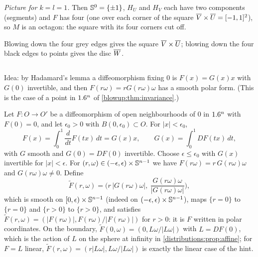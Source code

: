 \emph{Picture for $k=l=1$.} Then $\mathbb{S}^0=\{\pm1\}$, $H_U$ and $H_V$ each have two
components (segments) and $F$ has four (one over each corner of the square
$\overline{V}\times\overline{U}=[-1,1]^2$), so $M$ is an octagon: the square with its four corners
cut off.
\begin{center}
\end{center}
Blowing down the four grey edges gives the square $\overline{V}\times\overline{U}$; blowing down the
four black edges to points gives the disc $\overline{W}$.

\subsection*{}
Idea: by Hadamard's lemma a diffeomorphism fixing $0$ is $F(x)=G(x)x$ with $G(0)$
invertible, and then $F(r\omega)=rG(r\omega)\omega$ has a smooth polar form.
(This is the case of a point in $1.6^n$ of \cref{blowup:thm:invariance}.)

Let $F\colon O\to O'$ be a diffeomorphism of open neighbourhoods of $0$ in $1.6^n$ with
$F(0)=0$, and let $\epsilon_0>0$ with $B(0,\epsilon_0)\subset O$. For $|x|<\epsilon_0$,
\[
  F(x)=\int_0^1\frac{d}{dt}F(tx)\,dt=G(x)x,\qquad G(x)=\int_0^1DF(tx)\,dt,
\]
with $G$ smooth and $G(0)=DF(0)$ invertible. Choose $\epsilon\le\epsilon_0$ with $G(x)$
invertible for $|x|<\epsilon$. For $(r,\omega)\in(-\epsilon,\epsilon)\times\mathbb{S}^{n-1}$
we have $F(r\omega)=r\,G(r\omega)\omega$ and $G(r\omega)\omega\neq0$. Define
\[
  \tilde F(r,\omega)=\Big(r\,|G(r\omega)\omega|,\ \frac{G(r\omega)\omega}{|G(r\omega)\omega|}\Big),
\]
which is smooth on $[0,\epsilon)\times\mathbb{S}^{n-1}$ (indeed on $(-\epsilon,\epsilon)\times\mathbb{S}^{n-1}$),
maps $\{r=0\}$ to $\{r=0\}$ and $\{r>0\}$ to $\{r>0\}$, and satisfies
$\tilde F(r,\omega)=(|F(r\omega)|,F(r\omega)/|F(r\omega)|)$ for $r>0$: it is $F$ written
in polar coordinates. On the boundary, $\tilde F(0,\omega)=(0,L\omega/|L\omega|)$ with
$L=DF(0)$, which is the action of $L$ on the sphere at infinity in
\cref{distributions:prop:affine}; for $F=L$ linear, $\tilde F(r,\omega)=(r|L\omega|,L\omega/|L\omega|)$
is exactly the linear case of the hint.

